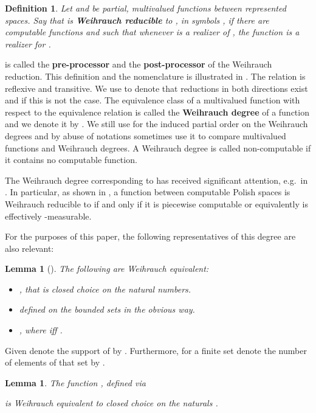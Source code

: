 \documentclass{eptcs-modified}
\newtheorem{definition}[theorem]{Definition}
\newtheorem{lemma}[theorem]{Lemma}
\newcommand{\demph}{\textbf}
\begin{document}
			\begin{definition}\label{def:weihrauch}
				Let  and  be partial, multivalued functions between represented spaces.
				Say that  is \demph{Weihrauch reducible} to , in symbols , if there are computable
				functions  and  such that whenever  is a realizer of , the function  is a realizer for .
			\end{definition}

			 is called the \demph{pre-processor} and  the \demph{post-processor} of the Weihrauch reduction.
			This definition and the nomenclature is illustrated in .
			The relation  is reflexive and transitive.
			We use  to denote that reductions in both directions exist and  if this is not the case.
			The equivalence class of a multivalued function with respect to the equivalence relation  is called the \demph{Weihrauch degree} of a function  and we denote it by .
			We still use  for the induced partial order on the Weihrauch degrees and by abuse of notations sometimes use it to compare multivalued functions and Weihrauch degrees.
			A Weihrauch degree is called non-computable if it contains no computable function.

			The Weihrauch degree corresponding to  has received significant attention, e.g.~in \cite{MR2760117,MR2915694,paulymaster,mylatz,mylatzb,MR3350999,paulyoracletypetwo,mummert,paulyneumann}.
			In particular, as shown in \cite{paulydebrecht}, a function between computable Polish spaces is Weihrauch reducible to  if and only if it is piecewise computable or equivalently is effectively -measurable.
			
			For the purposes of this paper, the following representatives of this degree are also relevant:
			\begin{lemma}[\cite{pauly-fouche2}]\label{lemma:cn}
				The following are Weihrauch equivalent:
				\begin{itemize}
					\item , that is closed choice on the natural numbers.
					\item  defined on the bounded sets in the obvious way.
					\item , where  iff .
				\end{itemize}
			\end{lemma}

			Given  denote the support of  by .
			Furthermore, for a finite set  denote the number of elements of that set by .
			\begin{lemma}\label{lemma:count}
				The function , defined via
				
				is Weihrauch equivalent to closed choice on the naturals .
			\end{lemma}
\end{document}
